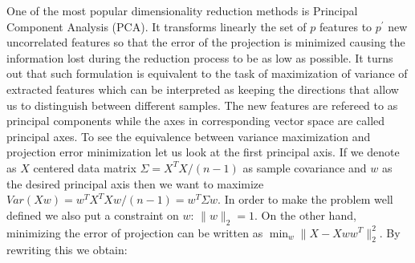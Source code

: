 \documentclass[12pt, wide]{mwart}
\begin{document}
One of the most popular dimensionality reduction methods is Principal Component Analysis (PCA). It transforms linearly the set of $p$ features to $p^{\prime}$ new uncorrelated features so that the error of the projection is minimized causing the information lost during the reduction process to be as low as possible. It turns out that such formulation is equivalent to the task of maximization of variance of extracted features which can be interpreted as keeping the directions that allow us to distinguish between different samples. The new features are refereed to as principal components while the axes in corresponding vector space are called principal axes. To see the equivalence between variance maximization and projection error minimization let us look at the first principal axis. If we denote as $X$ centered data matrix $\Sigma = X^TX/(n-1)$ as sample covariance and $w$ as the desired principal axis then we want to maximize $Var(Xw) = w^TX^TXw/(n-1) = w^T\Sigma w$. In order to make the problem well defined we also put a constraint on $w$: $\|w\|_2 = 1$. On the other hand, minimizing the error of projection can be written as $\min_w \| X - X ww^T\|_2^2$. By rewriting this we obtain: 
\end{document}
